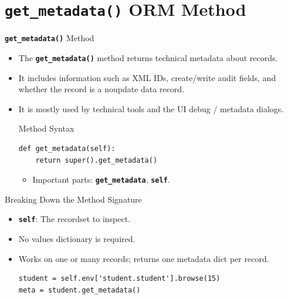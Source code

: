 
\section{\textbf{\texttt{get\_metadata()}} ORM Method}

\begin{frame}[fragile]{\textbf{\texttt{get\_metadata()}} Method}
	\begin{itemize}
		\item The \textbf{\texttt{get\_metadata()}} method returns technical metadata about records.
		\item It includes information such as XML IDs, create/write audit fields, and whether the record is a noupdate data record.
		\item It is mostly used by technical tools and the UI debug / metadata dialogs.
\begin{block}{Method Syntax}
\begin{lstlisting}
def get_metadata(self):
	return super().get_metadata()
\end{lstlisting}
	\begin{itemize}
		\item Important parts: \textbf{\texttt{get\_metadata}}, \textbf{\texttt{self}}.
	\end{itemize}
\end{block}
	\end{itemize}
\end{frame}

\begin{frame}[fragile]{Breaking Down the Method Signature}
	\begin{block}{}
		\begin{itemize}
			\item \textbf{\texttt{self}}: The recordset to inspect.
			\item No values dictionary is required.
			\item Works on one or many records; returns one metadata dict per record.
\begin{lstlisting}
student = self.env['student.student'].browse(15)
meta = student.get_metadata()
\end{lstlisting}
		\end{itemize}
	\end{block}
\end{frame}

